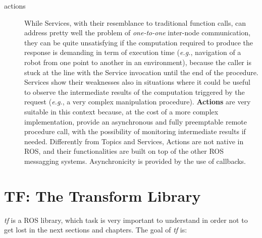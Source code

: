 \begin{description}
\item[actions] While Services, with their resemblance to traditional function calls, can address pretty well the problem of \textit{one-to-one} inter-node communication, they can be quite unsatisfying if the computation required to produce the response is demanding in term of execution time (\textit{e.g.}, navigation of a robot from one point to another in an environment), because the caller is stuck at the line with the Service invocation until the end of the procedure. Services show their weaknesses also in situations where it could be useful to observe the intermediate results of the computation triggered by the request (\textit{e.g.}, a very complex manipulation procedure). \textbf{Actions} are very suitable in this context because, at the cost of a more complex implementation, provide an asynchronous and fully preemptable remote procedure call, with the possibility of monitoring intermediate results if needed. Differently from Topics and Services, Actions are not native in \ac{ROS}, and their functionalities are built on top of the other \ac{ROS} messagging systems. Asynchronicity is provided by the use of callbacks.
\end{description}

\section{TF: The Transform Library}\label{sec:tf}
\textit{tf} is a \ac{ROS} library, which task is very important to understand in order not to get lost in the next sections and chapters.  The goal of \textit{tf} is:

